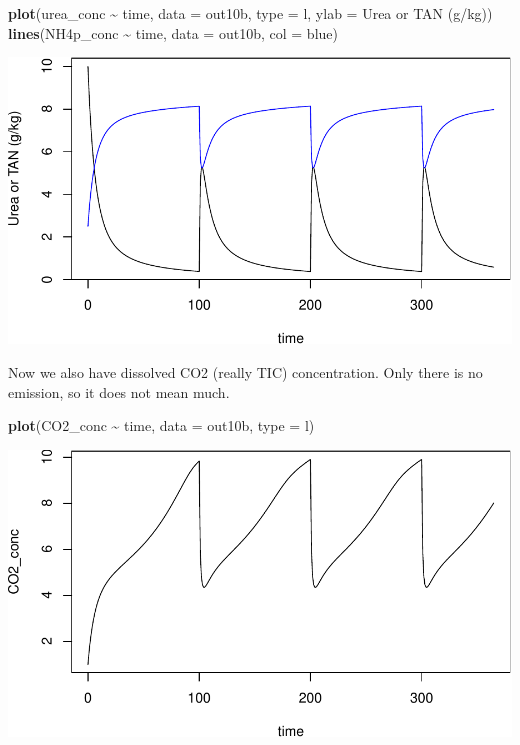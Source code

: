 \documentclass[
]{article}
\newenvironment{Shaded}{\begin{snugshade}}{\end{snugshade}}
\newcommand{\AttributeTok}[1]{\textcolor[rgb]{0.13,0.29,0.53}{#1}}
\newcommand{\FunctionTok}[1]{\textcolor[rgb]{0.13,0.29,0.53}{\textbf{#1}}}
\newcommand{\NormalTok}[1]{#1}
\newcommand{\SpecialCharTok}[1]{\textcolor[rgb]{0.81,0.36,0.00}{\textbf{#1}}}
\newcommand{\StringTok}[1]{\textcolor[rgb]{0.31,0.60,0.02}{#1}}
\begin{document}
\begin{Shaded}
\begin{Highlighting}[]
\FunctionTok{plot}\NormalTok{(urea\_conc }\SpecialCharTok{\textasciitilde{}}\NormalTok{ time, }\AttributeTok{data =}\NormalTok{ out10b, }\AttributeTok{type =} \StringTok{\textquotesingle{}l\textquotesingle{}}\NormalTok{, }\AttributeTok{ylab =} \StringTok{\textquotesingle{}Urea or TAN (g/kg)\textquotesingle{}}\NormalTok{)}
\FunctionTok{lines}\NormalTok{(NH4p\_conc }\SpecialCharTok{\textasciitilde{}}\NormalTok{ time, }\AttributeTok{data =}\NormalTok{ out10b, }\AttributeTok{col =} \StringTok{\textquotesingle{}blue\textquotesingle{}}\NormalTok{)}
\end{Highlighting}
\end{Shaded}

\includegraphics{simple_demo_files/figure-latex/unnamed-chunk-82-2.pdf}

Now we also have dissolved CO2 (really TIC) concentration. Only there is
no emission, so it does not mean much.

\begin{Shaded}
\begin{Highlighting}[]
\FunctionTok{plot}\NormalTok{(CO2\_conc }\SpecialCharTok{\textasciitilde{}}\NormalTok{ time, }\AttributeTok{data =}\NormalTok{ out10b, }\AttributeTok{type =} \StringTok{\textquotesingle{}l\textquotesingle{}}\NormalTok{)}
\end{Highlighting}
\end{Shaded}

\includegraphics{simple_demo_files/figure-latex/unnamed-chunk-83-1.pdf}
\end{document}
